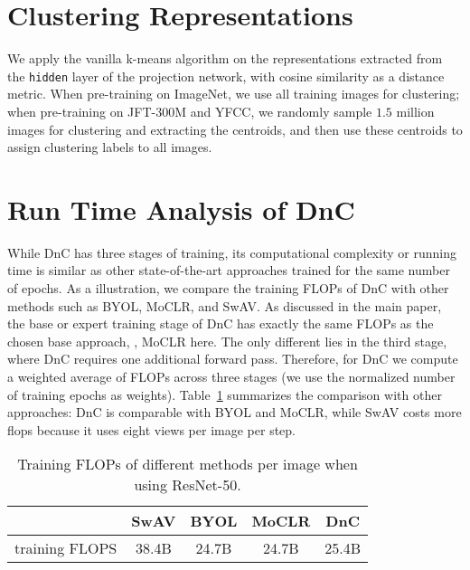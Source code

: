 \documentclass[final]{cvpr}
\newcommand\baseline{MoCLR}
\newcommand\jft{JFT-300M}
\begin{document}
\section{Clustering Representations}
We apply the vanilla k-means algorithm on the representations extracted from the \texttt{hidden} layer of the projection network, with cosine similarity as a distance metric. When pre-training on ImageNet, we use all training images for clustering; when pre-training on \jft{} and YFCC, we randomly sample $1.5$ million images for clustering and extracting the centroids, and then use these centroids to assign clustering labels to all images. 

\section{Run Time Analysis of DnC}\label{sec:run_time}

While DnC has three stages of training, its computational complexity or running time is similar as other state-of-the-art approaches trained for the same number of epochs. As a illustration, we compare the training FLOPs of DnC with other methods such as BYOL, \baseline{}, and SwAV. As discussed in the main paper, the base or expert training stage of DnC has exactly the same FLOPs as the chosen base approach, \ie, \baseline{} here. The only different lies in the third stage, where DnC requires one additional forward pass. Therefore, for DnC we compute a weighted average of FLOPs across three stages (we use the normalized number of training epochs as weights). Table~\ref{tab:flops} summarizes the comparison with other approaches: DnC is comparable with BYOL and \baseline{}, while SwAV costs more flops because it uses eight views per image per step.

\begin{table}[t]
\caption{Training FLOPs of different methods per image when using ResNet-50.}
\label{tab:flops}
\setlength{\tabcolsep}{4.5pt}
\begin{center}
\begin{small}
\begin{tabular}{c|cccc}
\toprule
               & SwAV  & BYOL  & MoCLR & DnC \\
\midrule
training FLOPS & 38.4B & 24.7B & 24.7B & 25.4B \\
\bottomrule
\end{tabular}
\end{small}
\end{center}
\end{table}
\end{document}
